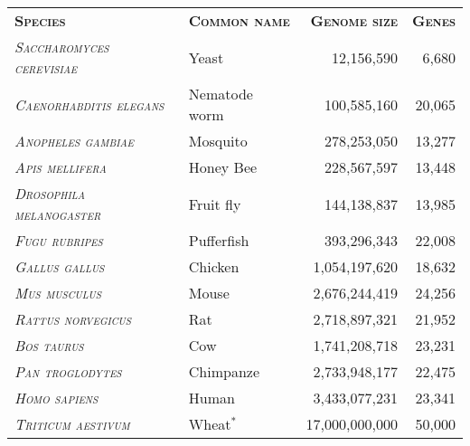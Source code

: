 \documentclass{article}
\begin{document}
\begin{center}

\noindent\begin{minipage}{\linewidth}%
\begin{center}%
\begin{tabular}{>{\scshape}llrr}%
\rowcolor[gray]{0.9}
\color{black} \bfseries \scshape Species & \bfseries \scshape Common name & \bfseries \scshape Genome size & \bfseries \scshape Genes\\
\emph{Saccharomyces cerevisiae} & Yeast & 12,156,590 & 6,680\\
\emph{Caenorhabditis elegans} & Nematode worm & 100,585,160 & 20,065\\
\emph{Anopheles gambiae} & Mosquito & 278,253,050 & 13,277\\
\emph{Apis mellifera} & Honey Bee & 228,567,597 & 13,448\\
\emph{Drosophila melanogaster} & Fruit fly & 144,138,837 & 13,985\\
\emph{Fugu rubripes} & Pufferfish & 393,296,343 & 22,008\\
\emph{Gallus gallus} & Chicken & 1,054,197,620 & 18,632\\
\emph{Mus musculus} & Mouse & 2,676,244,419 & 24,256\\
\emph{Rattus norvegicus} & Rat & 2,718,897,321 & 21,952\\
\emph{Bos taurus} & Cow & 1,741,208,718 & 23,231\\
\emph{Pan troglodytes} & Chimpanze & 2,733,948,177 & 22,475\\
\emph{Homo sapiens} & Human & 3,433,077,231 & 23,341\\
\emph{Triticum aestivum} & Wheat$^*$ & 17,000,000,000 & 50,000\\
\end{tabular}%
\end{center}%
\end{minipage}%

\end{center}%
\end{document}
